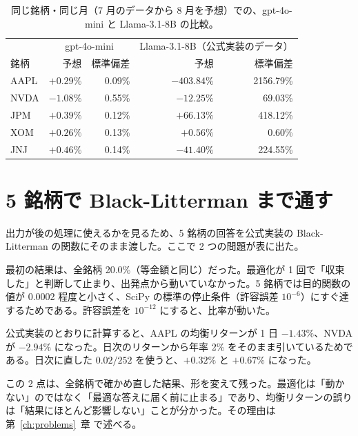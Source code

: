 \documentclass[xelatex,ja=standard,jafont=hiragino-pron,a4paper,10pt]{bxjsreport}
\newcommand{\chapref}[1]{第~\ref{#1}~章}
\begin{document}
\begin{table}[htbp]
\centering
\caption{同じ銘柄・同じ月（7 月のデータから 8 月を予想）での、gpt-4o-mini と Llama-3.1-8B の比較。}
\label{tab:llama}
\small
\begin{tabular}{lrrrr}
\toprule
 & \multicolumn{2}{c}{gpt-4o-mini} & \multicolumn{2}{c}{Llama-3.1-8B（公式実装のデータ）} \\
銘柄 & 予想 & 標準偏差 & 予想 & 標準偏差 \\
\midrule
AAPL & $+0.29\%$ & 0.09\% & $-403.84\%$ & 2156.79\% \\
NVDA & $-1.08\%$ & 0.55\% & $-12.25\%$ & 69.03\% \\
JPM & $+0.39\%$ & 0.12\% & $+66.13\%$ & 418.12\% \\
XOM & $+0.26\%$ & 0.13\% & $+0.56\%$ & 0.60\% \\
JNJ & $+0.46\%$ & 0.14\% & $-41.40\%$ & 224.55\% \\
\bottomrule
\end{tabular}
\end{table}

\section{5 銘柄で Black-Litterman まで通す}

出力が後の処理に使えるかを見るため、5 銘柄の回答を公式実装の Black-Litterman の関数にそのまま渡した。ここで 2 つの問題が表に出た。

\begin{description}[leftmargin=2em,style=nextline,itemsep=0.4em]
\item[最適化が動かない] 最初の結果は、全銘柄 20.0\%（等金額と同じ）だった。最適化が 1 回で「収束した」と判断して止まり、出発点から動いていなかった。5 銘柄では目的関数の値が 0.0002 程度と小さく、SciPy の標準の停止条件（許容誤差 $10^{-6}$）にすぐ達するためである。許容誤差を $10^{-12}$ にすると、比率が動いた。
\item[均衡リターンの値がおかしい] 公式実装のとおりに計算すると、AAPL の均衡リターンが 1 日 $-1.43\%$、NVDA が $-2.94\%$ になった。日次のリターンから年率 2\% をそのまま引いているためである。日次に直した $0.02/252$ を使うと、$+0.32\%$ と $+0.67\%$ になった。
\end{description}

この 2 点は、全銘柄で確かめ直した結果、形を変えて残った。最適化は「動かない」のではなく「最適な答えに届く前に止まる」であり、均衡リターンの誤りは「結果にほとんど影響しない」ことが分かった。その理由は \chapref{ch:problems} で述べる。
\end{document}

